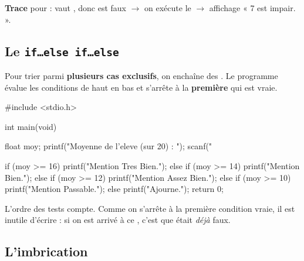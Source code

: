 

\textbf{Trace} pour  :  vaut , donc  est
faux $\rightarrow$ on exécute le  $\rightarrow$ affichage
« 7 est impair. ».

\subsection{Le \texttt{if\dots else if\dots else}}

Pour trier parmi \textbf{plusieurs cas exclusifs}, on enchaîne des .
Le programme évalue les conditions de haut en bas et s'arrête à la \textbf{première}
qui est vraie.

\begin{codec}
#include <stdio.h>

int main(void) {
    float moy;
    printf("Moyenne de l'eleve (sur 20) : ");
    scanf("%

    if (moy >= 16) {
        printf("Mention Tres Bien.\n");
    } else if (moy >= 14) {
        printf("Mention Bien.\n");
    } else if (moy >= 12) {
        printf("Mention Assez Bien.\n");
    } else if (moy >= 10) {
        printf("Mention Passable.\n");
    } else {
        printf("Ajourne.\n");
    }
    return 0;
}
\end{codec}


\begin{remarque}
L'ordre des tests compte. Comme on s'arrête à la première condition vraie, il est
inutile d'écrire  : si on est arrivé à ce
, c'est que  était \emph{déjà} faux.
\end{remarque}

\subsection{L'imbrication}


